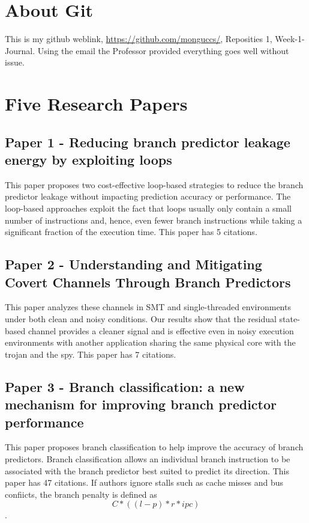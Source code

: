 \documentclass[conference]{IEEEtran}
\begin{document}
\section{About Git}
This is my github weblink, \href{https://github.com/monguccs/}{https://github.com/monguccs/},  Reposities 1, Week-1-Journal. Using the email the Professor provided everything goes well without issue.
 


\section{Five Research Papers}

\subsection{Paper 1 - Reducing branch predictor leakage energy by exploiting loops}

This paper \cite{b1} proposes two cost-effective loop-based strategies to reduce the branch predictor leakage without impacting prediction accuracy or performance. The loop-based approaches exploit the fact that loops usually only contain a small number of instructions and, hence, even fewer branch instructions while taking a significant fraction of the execution time. This paper has 5 citations.


\subsection{Paper 2 - Understanding and Mitigating Covert Channels Through Branch Predictors}

This paper \cite{b2} analyzes these channels in SMT and single-threaded environments under both clean and noisy conditions. Our results show that the residual state-based channel provides a cleaner signal and is effective even in noisy execution environments with another application sharing the same physical core with the trojan and the spy. This paper has 7 citations.

\subsection{Paper 3 - Branch classification: a new mechanism for improving branch predictor performance }

This paper \cite{b3} proposes branch classification to help improve the accuracy of branch predictors. Branch classification allows an individual branch instruction to be associated with the branch predictor best suited to predict its direction. This paper has 47 citations.
If authors ignore stalls such as cache misses and bus confiicts, the branch penalty is defined as \[ C * ((l-p) * r * ipc) \].
\end{document}
